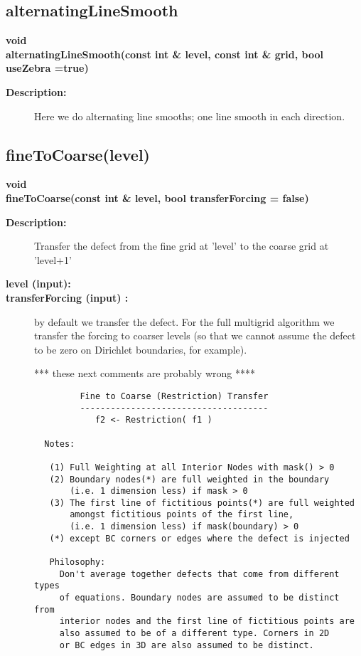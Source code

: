 \subsection{alternatingLineSmooth}
 
\begin{flushleft} \textbf{%
void   \\ 
\settowidth{\OgmgIncludeArgIndent}{alternatingLineSmooth(}%
alternatingLineSmooth(const int \& level, const int \& grid, bool useZebra  =true)
}\end{flushleft}
\begin{description}
\item[{\bf Description:}] 
    Here we do alternating line smooths; one line smooth in each direction.
\end{description}
\subsection{fineToCoarse(level)}
 
\begin{flushleft} \textbf{%
void  \\ 
\settowidth{\OgmgIncludeArgIndent}{fineToCoarse(}%
fineToCoarse(const int \& level, bool transferForcing  = false)
}\end{flushleft}
\begin{description}
\item[{\bf Description:}] 
     Transfer the defect from the fine grid at 'level' to the coarse grid at 'level+1'
\item[{\bf level (input):}] 
\item[{\bf transferForcing (input) :}]  by default we transfer the defect. For the full multigrid algorithm we
    transfer the forcing to coarser levels (so that we cannot assume the defect to be zero on Dirichlet
    boundaries, for example).

 *** these next comments are probably wrong ****
 \begin{verbatim}
         Fine to Coarse (Restriction) Transfer
         -------------------------------------
            f2 <- Restriction( f1 )
 
  Notes:
 
   (1) Full Weighting at all Interior Nodes with mask() > 0
   (2) Boundary nodes(*) are full weighted in the boundary
       (i.e. 1 dimension less) if mask > 0
   (3) The first line of fictitious points(*) are full weighted
       amongst fictitious points of the first line,
       (i.e. 1 dimension less) if mask(boundary) > 0
   (*) except BC corners or edges where the defect is injected
 
   Philosophy:
     Don't average together defects that come from different types
     of equations. Boundary nodes are assumed to be distinct from
     interior nodes and the first line of fictitious points are
     also assumed to be of a different type. Corners in 2D
     or BC edges in 3D are also assumed to be distinct.
 \end{verbatim}

\end{description}
